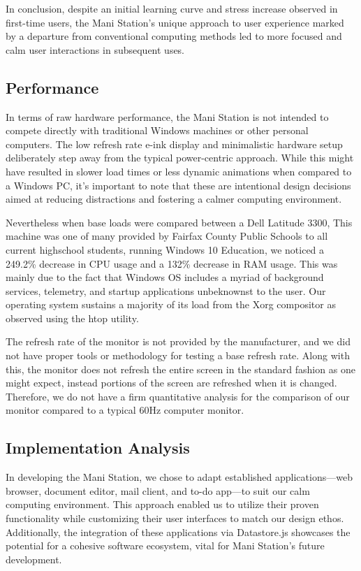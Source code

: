 \documentclass[letterpaper,twocolumn,10pt]{article}
\begin{document}
In conclusion, despite an initial learning curve and stress increase observed in first-time users, the Mani Station's unique approach to user experience marked by a departure from conventional computing methods led to more focused and calm user interactions in subsequent uses.
\subsection{Performance}
In terms of raw hardware performance, the Mani Station is not intended to compete directly with traditional Windows machines or other personal computers. The low refresh rate e-ink display and minimalistic hardware setup deliberately step away from the typical power-centric approach. While this might have resulted in slower load times or less dynamic animations when compared to a Windows PC, it's important to note that these are intentional design decisions aimed at reducing distractions and fostering a calmer computing environment.

Nevertheless when base loads were compared between a Dell Latitude 3300, This machine was one of many provided by Fairfax County Public Schools to all current highschool students, running Windows 10 Education, we noticed a 249.2\% decrease in CPU usage and a 132\% decrease in RAM usage. This was mainly due to the fact that Windows OS includes a myriad of background services, telemetry, and startup applications unbeknownst to the user. Our operating system sustains a majority of its load from the Xorg compositor as observed using the htop utility.

The refresh rate of the monitor is not provided by the manufacturer, and we did not have proper tools or methodology for testing a base refresh rate. Along with this, the monitor does not refresh the entire screen in the standard fashion as one might expect, instead portions of the screen are refreshed when it is changed. Therefore, we do not have a firm quantitative analysis for the comparison of our monitor compared to a typical 60Hz computer monitor.
\subsection{Implementation Analysis}
In developing the Mani Station, we chose to adapt established applications—web browser, document editor, mail client, and to-do app—to suit our calm computing environment. This approach enabled us to utilize their proven functionality while customizing their user interfaces to match our design ethos. Additionally, the integration of these applications via Datastore.js showcases the potential for a cohesive software ecosystem, vital for Mani Station's future development.
\end{document}
